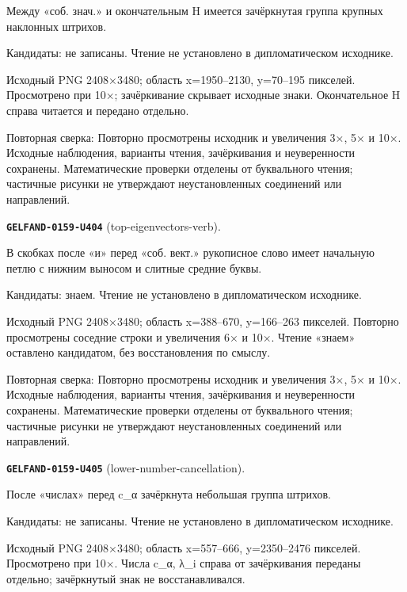 Между «соб. знач.» и окончательным H имеется зачёркнутая группа крупных наклонных штрихов.\par
Кандидаты: не записаны. Чтение не установлено в дипломатическом исходнике.\par
Исходный PNG 2408×3480; область x=1950–2130, y=70–195 пикселей. Просмотрено при 10×; зачёркивание скрывает исходные знаки. Окончательное H справа читается и передано отдельно.\par
Повторная сверка: Повторно просмотрены исходник и увеличения 3×, 5× и 10×. Исходные наблюдения, варианты чтения, зачёркивания и неуверенности сохранены. Математические проверки отделены от буквального чтения; частичные рисунки не утверждают неустановленных соединений или направлений.\par\medskip
\par\noindent\leavevmode{}\label{GELFAND-0159-U404}\label{GELFAND-P001470:top-eigenvectors-verb}\textbf{\texttt{GELFAND-0159-U404}} (top-eigenvectors-verb).\nopagebreak[4]\par
В скобках после «и» перед «соб. вект.» рукописное слово имеет начальную петлю с нижним выносом и слитные средние буквы.\par
Кандидаты: знаем. Чтение не установлено в дипломатическом исходнике.\par
Исходный PNG 2408×3480; область x=388–670, y=166–263 пикселей. Повторно просмотрены соседние строки и увеличения 6× и 10×. Чтение «знаем» оставлено кандидатом, без восстановления по смыслу.\par
Повторная сверка: Повторно просмотрены исходник и увеличения 3×, 5× и 10×. Исходные наблюдения, варианты чтения, зачёркивания и неуверенности сохранены. Математические проверки отделены от буквального чтения; частичные рисунки не утверждают неустановленных соединений или направлений.\par\medskip
\par\noindent\leavevmode{}\label{GELFAND-0159-U405}\label{GELFAND-P001470:lower-number-cancellation}\textbf{\texttt{GELFAND-0159-U405}} (lower-number-cancellation).\nopagebreak[4]\par
После «числах» перед c\_α зачёркнута небольшая группа штрихов.\par
Кандидаты: не записаны. Чтение не установлено в дипломатическом исходнике.\par
Исходный PNG 2408×3480; область x=557–666, y=2350–2476 пикселей. Просмотрено при 10×. Числа c\_α, λ\_i справа от зачёркивания переданы отдельно; зачёркнутый знак не восстанавливался.\par
